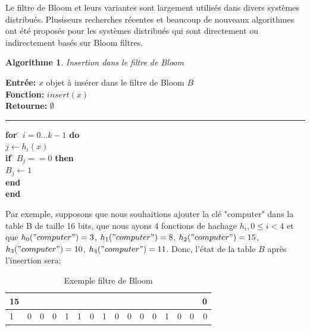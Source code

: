 	Le filtre de Bloom et leurs variantes sont largement utilisés dans divers systèmes distribués. Plusiseurs recherches récentes et beaucoup de nouveaux algorithmes ont été proposés pour les systèmes distribués qui sont directement ou indirectement basés sur Bloom filtres\cite{theory-and-practice-of-bloom-filters-for-distributed-systems}.
	
\newtheorem{algorithme}{Algorithme}
\begin{algorithme}
	Insertion dans le filtre de Bloom
\end{algorithme}

\begin{flushleft}
	\begin{framed}
		\textbf{Entrée:} $x$ objet à insérer dans le filtre de Bloom $B$\\
		\textbf{Fonction:} $insert(x)$\\
		\textbf{Retourne:} $\emptyset$
		\noindent\rule{\linewidth}{0.5pt}

		\begin{tabbing}
			\textbf{for} \= $i = 0 ... k - 1$ \textbf{do}\\
					\> $j \leftarrow h_i(x)$\\
					\> \textbf{if} \= $B_j == 0$ \textbf{then}\\
					\> \> $B_j \leftarrow 1$\\
					\> \textbf{end}\\
			\textbf{end}
	    	\end{tabbing}		
	\end{framed}
\end{flushleft}
	
	Par exemple, supposons que nous souhaitions ajouter la clé "computer" dans la table B de taille 16 bits, que nous ayons 4 fonctions de hachage $ h_i, 0 \leq i < 4 $ et que $ h_0("computer") = 3$, $ h_1("computer") = 8$, $ h_2("computer") = 15$, $h_3("computer") = 10$, $h_4("computer") = 11 $. Donc, l'état de la table $ B $ après l'insertion sera:
	\begin{table}[!h]
		\centering		
		\begin{tabular}{|l|*{14}{c|}r|}
		\multicolumn{1}{c}{{\scriptsize 15}} &\multicolumn{1}{c}{}&\multicolumn{1}{c}{}&\multicolumn{1}{c}{}&\multicolumn{1}{c}{}&\multicolumn{1}{c}{}&\multicolumn{1}{c}{}&\multicolumn{1}{c}{}&\multicolumn{1}{c}{}&\multicolumn{1}{c}{}&\multicolumn{1}{c}{}&\multicolumn{1}{c}{}&\multicolumn{1}{c}{}&\multicolumn{1}{c}{}&\multicolumn{1}{c}{}&\multicolumn{1}{c}{{\scriptsize 0}}\\
		\hline
			1 & 0 & 0 & 0 & 1 & 1 & 0 & 1 & 0 & 0 & 0 & 0 & 1 & 0 & 0 & 0 \\
		\hline
		\end{tabular}
		\caption{Exemple filtre de Bloom}
		\label{filtredeBloom/exemple}
	\end{table}
	
